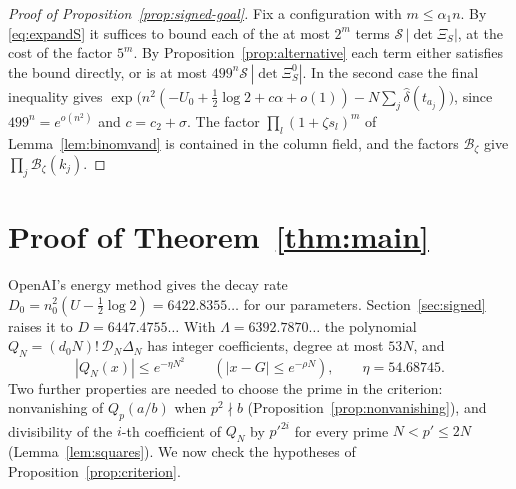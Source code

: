 \documentclass[11pt]{amsart}
\newcommand{\EtaTot}{54.68745}
\newcommand{\Decay}{6447.4755}
\newcommand{\DecayOA}{6422.8355}
\newcommand{\LamDen}{6392.7870}
\theoremstyle{definition}
\theoremstyle{remark}
\numberwithin{equation}{section}
\newcommand{\cD}{\mathcal D}
\begin{document}
\begin{proof}[Proof of Proposition~\ref{prop:signed-goal}]
Fix a configuration with $m\le\alpha_1n$. By \eqref{eq:expandS} it suffices to bound each of the at most $2^m$ terms
$\mathcal S\,|\det\Xi_S|$, at the cost of the factor $5^m$. By Proposition~\ref{prop:alternative} each term either satisfies the
bound directly, or is at most $499^n\mathcal S\,|\det\Xi^0_S|$. In the second case the final inequality gives
$\exp\bigl(n^2(-U_0+\frac12\log2+c\alpha+o(1))-N\sum_j\hat\delta(t_{a_j})\bigr)$, since $499^n=e^{o(n^2)}$ and $c=c_2+\sigma$.
The factor $\prod_l(1+\zeta s_l)^m$ of Lemma~\ref{lem:binomvand} is contained in the column field, and the factors $\mathcal B_\zeta$ give
$\prod_j\mathcal B_\zeta(k_j)$.
\end{proof}
\section{Proof of Theorem~\ref{thm:main}}\label{sec:proof}

OpenAI's energy method gives the decay rate $D_0=n_0^2(U-\frac12\log2)=\DecayOA\ldots$ for our parameters.
Section~\ref{sec:signed} raises it to $D=\Decay\ldots$ With $\Lambda=\LamDen\ldots$ the polynomial
$Q_N=(d_0N)!\,\cD_N\Delta_N$ has integer coefficients, degree at most $53N$, and
\[
 |Q_N(x)|\le e^{-\eta N^2}\qquad(|x-G|\le e^{-\rho N}),\qquad \eta=\EtaTot .
\]
Two further properties are needed to choose the prime in the criterion: nonvanishing of $Q_p(a/b)$ when
$p^2\nmid b$ (Proposition~\ref{prop:nonvanishing}), and divisibility of the $i$-th coefficient of $Q_N$ by
$p'^{2i}$ for every prime $N<p'\le2N$ (Lemma~\ref{lem:squares}). We now check the hypotheses of
Proposition~\ref{prop:criterion}.
\end{document}
